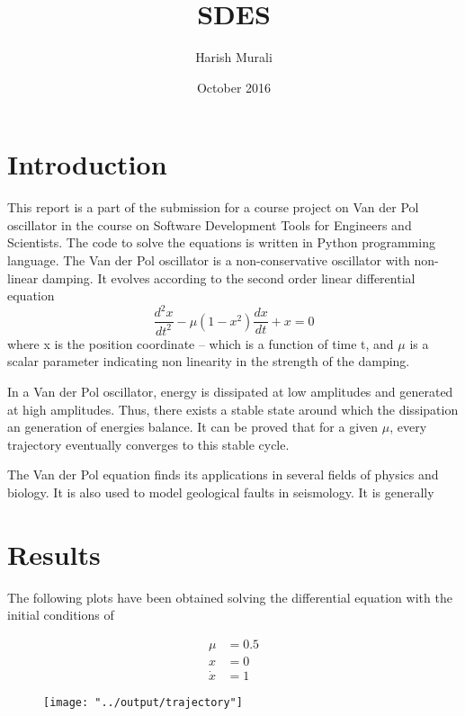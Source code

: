\documentclass{report}
\title{SDES}
\author{Harish Murali}
\date{October 2016}
\begin{document}
\maketitle
\section{Introduction}
This report is a part of the submission for a course project on Van der Pol oscillator in the course on Software Development Tools for Engineers and Scientists. The code to solve the equations is written in Python programming language.
The Van der Pol oscillator is a non-conservative oscillator with non-linear damping. It evolves according to the second order linear differential equation
\begin{equation}
\frac{d^2x}{dt^2} - \mu(1 - x^2)\frac{dx}{dt} + x = 0
\end{equation}
where x is the position coordinate -- which is a function of time t, and $\mu$ is a scalar parameter indicating non linearity in the strength of the damping.

In a Van der Pol oscillator, energy is dissipated at low amplitudes and generated at high amplitudes. Thus, there exists a stable state around which the dissipation an generation of energies balance. It can be proved that for a given $\mu$, every trajectory eventually converges to this stable cycle. 

The Van der Pol equation finds its applications in several fields of physics and biology. It is also used to model geological faults in seismology. It is generally

\section{Results}

The following plots have been obtained solving the differential equation with the initial conditions of %

\begin{align*}
    \mu &= 0.5 \\
    x &= 0 \\
    \dot{x} &= 1
\end{align*}

\begin{figure}[ht]
\texttt{[image: "../output/trajectory"]}
\caption{} %
\label{trajectory}
\end{figure}
\newpage
\end{document}
